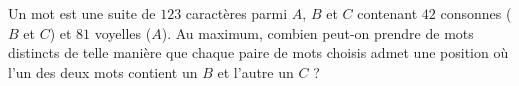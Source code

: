 Un mot est une suite de $123$ caractères parmi $A$, $B$ et $C$ contenant $42$ consonnes ($B$ et $C$) et $81$ voyelles ($A$). Au maximum, combien peut-on prendre de mots distincts de telle manière que chaque paire de mots choisis admet une position où l'un des deux mots contient un $B$ et l'autre un $C$ ?